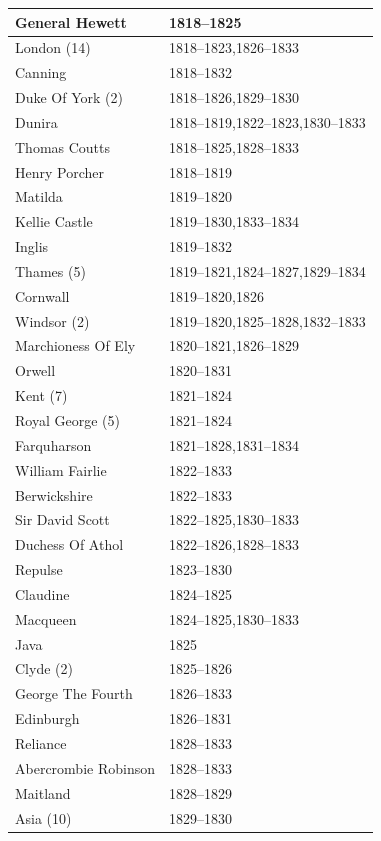 \documentclass[CP]{copernicus}
\begin{document}
\begin{table}[!hbp]
\begin{minipage}[b]{0.5\linewidth}
{\begin{tabular}{|p{3.5cm}|p{3.5cm}|}
\hline
General Hewett & 1818--1825\\
\hline
London (14) & 1818--1823,1826--1833\\
\hline
Canning & 1818--1832\\
\hline
Duke Of York (2) & 1818--1826,1829--1830\\
\hline
Dunira & 1818--1819,1822--1823,1830--1833\\
\hline
Thomas Coutts & 1818--1825,1828--1833\\
\hline
Henry Porcher & 1818--1819\\
\hline
Matilda & 1819--1820\\
\hline
Kellie Castle & 1819--1830,1833--1834\\
\hline
Inglis & 1819--1832\\
\hline
Thames (5) & 1819--1821,1824--1827,1829--1834\\
\hline
Cornwall & 1819--1820,1826\\
\hline
Windsor (2) & 1819--1820,1825--1828,1832--1833\\
\hline
Marchioness Of Ely & 1820--1821,1826--1829\\
\hline
Orwell & 1820--1831\\
\hline
Kent (7) & 1821--1824\\
\hline
Royal George (5) & 1821--1824\\
\hline
Farquharson & 1821--1828,1831--1834\\
\hline
William Fairlie & 1822--1833\\
\hline
Berwickshire & 1822--1833\\
\hline
Sir David Scott & 1822--1825,1830--1833\\
\hline
Duchess Of Athol & 1822--1826,1828--1833\\
\hline
Repulse & 1823--1830\\
\hline
Claudine & 1824--1825\\
\hline
Macqueen & 1824--1825,1830--1833\\
\hline
Java & 1825\\
\hline
Clyde (2) & 1825--1826\\
\hline
George The Fourth & 1826--1833\\
\hline
Edinburgh & 1826--1831\\
\hline
Reliance & 1828--1833\\
\hline
Abercrombie Robinson & 1828--1833\\
\hline
Maitland & 1828--1829\\
\hline
Asia (10) & 1829--1830\\

\end{tabular}}
\end{minipage}
\end{table}
\end{document}
